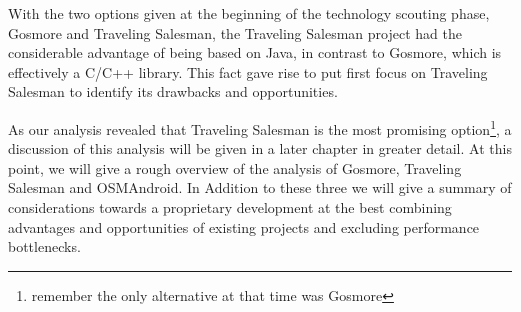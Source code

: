 With the two options given at the beginning of the technology scouting phase, Gosmore and Traveling Salesman, the Traveling Salesman project had the considerable advantage of being based on Java, in contrast to Gosmore, which is effectively a C/C++ library. This fact gave rise to put first focus on Traveling Salesman to identify its drawbacks and opportunities.\newline

As our analysis revealed that Traveling Salesman is the most promising option\footnote{remember the only alternative at that time was Gosmore}, a discussion of this analysis will be given in a later chapter in greater detail. At this point, we will give a rough overview of the analysis of Gosmore, Traveling Salesman and OSMAndroid. In Addition to these three we will give a summary of considerations towards a proprietary development at the best combining advantages and opportunities of existing projects and excluding performance bottlenecks.\newline

